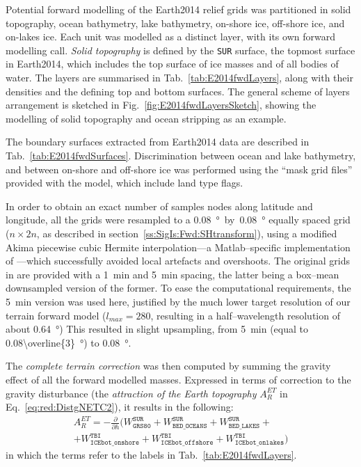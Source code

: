 Potential forward modelling of the {Earth2014} relief grids was partitioned in solid topography, ocean bathymetry, lake bathymetry, on-shore ice, off-shore ice, and on-lakes ice.
Each unit was modelled as a distinct layer, with its own forward modelling call.
\textit{Solid topography} is defined by the \verb|SUR| surface, the topmost surface in {Earth2014}, which includes the top surface of ice masses and of all bodies of water.
The layers are summarised in Tab.~\ref{tab:E2014fwdLayers}, along with their densities and the defining top and bottom surfaces.
The general scheme of layers arrangement is sketched in Fig.~\ref{fig:E2014fwdLayersSketch}, showing the modelling of solid topography and ocean stripping as an example.

The boundary surfaces extracted from {Earth2014} data are described in Tab.~\ref{tab:E2014fwdSurfaces}.
Discrimination between ocean and lake bathymetry, and between on-shore and off-shore ice was performed using the ``mask grid files'' provided with the model, which include land type flags.

In order to obtain an exact number of samples nodes along latitude and longitude, all the grids were resampled to a \SI{0.08}{\degree}~by~\SI{0.08}{\degree} equally spaced grid ($n \times 2n$, as described in section~\ref{ss:SigIs:Fwd:SHtransform}), using a modified Akima piecewise cubic Hermite interpolation---a Matlab--specific implementation of \textcite{Akima1974}---which successfully avoided local artefacts and overshoots.
The original grids in \textcite{Hirt2015} are provided with a \SI{1}{min} and \SI{5}{min} spacing, the latter being a box--mean downsampled version of the former.
To ease the computational requirements, the \SI{5}{min} version was used here, justified by the much lower target resolution of our terrain forward model ($l_{max} = \num{280}$, resulting in a half--wavelength resolution of about \SI{0,64}{\degree})
This resulted in slight upsampling, from \SI{5}{min} (equal to \SI[parse-numbers=false]{0.08\overline{3}}{\degree}) to \SI{0.08}{\degree}.

The \textit{complete terrain correction} was then computed by summing the gravity effect of all the forward modelled masses.
Expressed in terms of correction to the gravity disturbance (the \textit{attraction of the Earth topography} $A_{R}^{ET}$ in Eq.~\ref{eq:red:DistgNETC2}), it results in the following:
\begin{multline}
    \label{eq:CompleteTC}
    A_{R}^{ET} =
    -\frac{\partial}{\partial h}
    (
        W^{\mathtt{SUR}}_{\mathtt{GRS80}} +
        W^{\mathtt{SUR}}_{\mathtt{BED\_OCEANS}} +
        W^{\mathtt{SUR}}_{\mathtt{BED\_LAKES}} + \\
        + W^{\mathtt{TBI}}_{\mathtt{ICEbot\_onshore}} +
        W^{\mathtt{TBI}}_{\mathtt{ICEbot\_offshore}} +
        W^{\mathtt{TBI}}_{\mathtt{ICEbot\_onlakes}}
    )
\end{multline}
in which the terms refer to the labels in Tab.~\ref{tab:E2014fwdLayers}.

